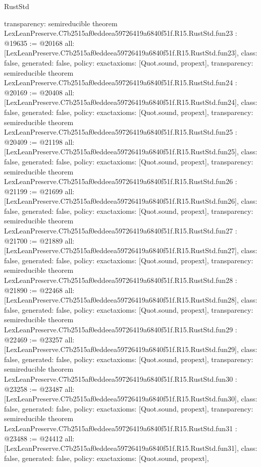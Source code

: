 \begin{lexlean}{RustStd}
\begin{coremodule}
{  transparency: semireducible
}
theorem LexLeanPreserve.C7b2515af0eddeea59726419a6840f51f.R15.RustStd.fun23 : @19635 := @20168 {
  all: [LexLeanPreserve.C7b2515af0eddeea59726419a6840f51f.R15.RustStd.fun23],
  class: false,
  generated: false,
  policy: exact{axioms: [Quot.sound, propext]},
  transparency: semireducible
}
theorem LexLeanPreserve.C7b2515af0eddeea59726419a6840f51f.R15.RustStd.fun24 : @20169 := @20408 {
  all: [LexLeanPreserve.C7b2515af0eddeea59726419a6840f51f.R15.RustStd.fun24],
  class: false,
  generated: false,
  policy: exact{axioms: [Quot.sound, propext]},
  transparency: semireducible
}
theorem LexLeanPreserve.C7b2515af0eddeea59726419a6840f51f.R15.RustStd.fun25 : @20409 := @21198 {
  all: [LexLeanPreserve.C7b2515af0eddeea59726419a6840f51f.R15.RustStd.fun25],
  class: false,
  generated: false,
  policy: exact{axioms: [Quot.sound, propext]},
  transparency: semireducible
}
theorem LexLeanPreserve.C7b2515af0eddeea59726419a6840f51f.R15.RustStd.fun26 : @21199 := @21699 {
  all: [LexLeanPreserve.C7b2515af0eddeea59726419a6840f51f.R15.RustStd.fun26],
  class: false,
  generated: false,
  policy: exact{axioms: [Quot.sound, propext]},
  transparency: semireducible
}
theorem LexLeanPreserve.C7b2515af0eddeea59726419a6840f51f.R15.RustStd.fun27 : @21700 := @21889 {
  all: [LexLeanPreserve.C7b2515af0eddeea59726419a6840f51f.R15.RustStd.fun27],
  class: false,
  generated: false,
  policy: exact{axioms: [Quot.sound, propext]},
  transparency: semireducible
}
theorem LexLeanPreserve.C7b2515af0eddeea59726419a6840f51f.R15.RustStd.fun28 : @21890 := @22468 {
  all: [LexLeanPreserve.C7b2515af0eddeea59726419a6840f51f.R15.RustStd.fun28],
  class: false,
  generated: false,
  policy: exact{axioms: [Quot.sound, propext]},
  transparency: semireducible
}
theorem LexLeanPreserve.C7b2515af0eddeea59726419a6840f51f.R15.RustStd.fun29 : @22469 := @23257 {
  all: [LexLeanPreserve.C7b2515af0eddeea59726419a6840f51f.R15.RustStd.fun29],
  class: false,
  generated: false,
  policy: exact{axioms: [Quot.sound, propext]},
  transparency: semireducible
}
theorem LexLeanPreserve.C7b2515af0eddeea59726419a6840f51f.R15.RustStd.fun30 : @23258 := @23487 {
  all: [LexLeanPreserve.C7b2515af0eddeea59726419a6840f51f.R15.RustStd.fun30],
  class: false,
  generated: false,
  policy: exact{axioms: [Quot.sound, propext]},
  transparency: semireducible
}
theorem LexLeanPreserve.C7b2515af0eddeea59726419a6840f51f.R15.RustStd.fun31 : @23488 := @24412 {
  all: [LexLeanPreserve.C7b2515af0eddeea59726419a6840f51f.R15.RustStd.fun31],
  class: false,
  generated: false,
  policy: exact{axioms: [Quot.sound, propext]},
}
\end{coremodule}
\end{lexlean}
